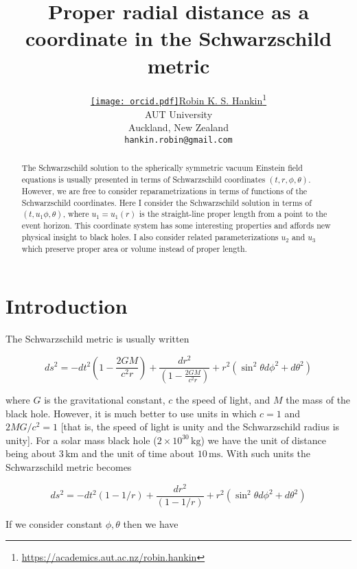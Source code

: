 \documentclass{article}
\title{Proper radial distance as a coordinate in the Schwarzschild metric}
\author{ \href{https://orcid.org/0000-0001-5982-0415}{\texttt{[image: orcid.pdf]}\hspace{1mm}Robin K. S. Hankin}\thanks{
\url{https://academics.aut.ac.nz/robin.hankin}}\\
              AUT University\\
              Auckland, New Zealand\\
	\texttt{hankin.robin@gmail.com} \\
}
\begin{document}
\maketitle

\begin{abstract}
The Schwarzschild solution to the spherically symmetric vacuum
Einstein field equations is usually presented in terms of
Schwarzschild coordinates $(t,r,\phi,\theta)$.  However, we are free
to consider reparametrizations in terms of functions of the
Schwarzschild coordinates.  Here I consider the Schwarzschild solution
in terms of $(t,u_1\phi,\theta)$, where $u_1=u_1(r)$ is the
straight-line proper length from a point to the event horizon.  This
coordinate system has some interesting properties and affords new
physical insight to black holes.  I also consider related
parameterizations $u_2$ and $u_3$ which preserve proper area or volume
instead of proper length.
\end{abstract}




\section{Introduction}
The Schwarzschild metric is usually written

\begin{equation}
  ds^2=-dt^2\left(1-\frac{2GM}{c^2r}\right)
  +\frac{dr^2}{\left(1-\frac{2GM}{c^2r}\right)} + r^2(\sin^2\theta
  d\phi^2 + d\theta^2)
\end{equation}

where $G$ is the gravitational constant, $c$ the speed of light, and
$M$ the mass of the black hole.  However, it is much better to use
units in which $c=1$ and $2MG/c^2=1$ [that is, the speed of light is
  unity and the Schwarzschild radius is unity].  For a solar mass
black hole ($2\times 10^{30}\,\mathrm{kg}$) we have the unit of
distance being about $3\,\mathrm{km}$ and the unit of time about
$10\,\mathrm{ms}$.  With such units the Schwarzschild metric becomes

\begin{equation}
  ds^2=-dt^2\left(1-1/r\right)
  +\frac{dr^2}{\left(1-1/r\right)} + r^2(\sin^2\theta d\phi^2 + d\theta^2)
\end{equation}

If we consider constant $\phi,\theta$ then we have 

\label{sec:headings}
\end{document}
